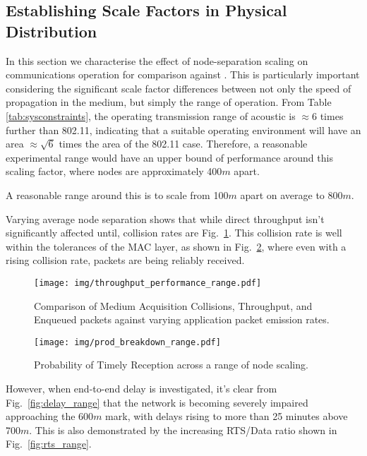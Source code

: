 \subsection{Establishing Scale Factors in Physical Distribution}

In this section we characterise the effect of node-separation scaling on communications operation for comparison against \cite{Guo11}. This is particularly important considering the significant scale factor differences between not only the speed of propagation in the medium, but simply the range of operation. 
From Table \ref{tab:sysconstraints}, the operating transmission range of acoustic is $\approx 6$ times further than 802.11, indicating that a suitable operating environment will have an area $\approx \sqrt{6}$ times the area of the 802.11 case. Therefore, a reasonable experimental range would have an upper bound of performance around this scaling factor, where nodes are approximately 400$m$ apart. 

A reasonable range around this is to scale from 100$m$ apart on average to 800$m$.

Varying average node separation shows that while direct throughput isn't significantly affected until, collision rates are Fig.~\ref{fig:throughput_performance_range}.
This collision rate is well within the tolerances of the MAC layer, as shown in Fig.~\ref{fig:prod_breakdown_range}, where even with a rising collision rate, packets are being reliably received.

\begin{figure}[H]
  \centering
  \texttt{[image: img/throughput\_performance\_range.pdf]}
  \caption{Comparison of Medium Acquisition Collisions, Throughput, and Enqueued packets against varying application packet emission rates.}
  \label{fig:throughput_performance_range}
\end{figure}

\begin{figure}[H]
  \centering
  \texttt{[image: img/prod\_breakdown\_range.pdf]}
  \caption{Probability of Timely Reception across a range of node scaling.}
  \label{fig:prod_breakdown_range}
\end{figure}

However, when end-to-end delay is investigated, it's clear from Fig.~\ref{fig:delay_range} that the network is becoming severely impaired approaching the 600$m$ mark, with delays rising to more than 25 minutes above 700$m$.
This is also demonstrated by the increasing RTS/Data ratio shown in Fig.~\ref{fig:rts_range}.

